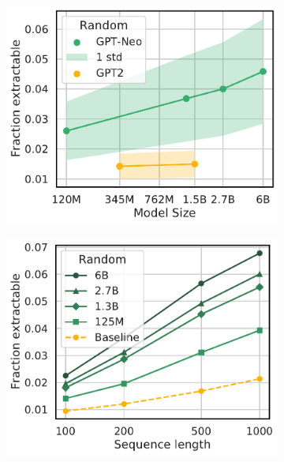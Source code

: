 \begin{figure}
    \centering
    \begin{subfigure}[a]{0.34\textwidth}
        \includegraphics[width=\textwidth]{figures/random-exactly_mem-vs-model_size-prompt-all-gen-50-xlabel-ylabel} %
        \caption{}
        \label{fig:other_approaches_randomsize}
    \end{subfigure}
    \hfill
    \begin{subfigure}[a]{0.34\textwidth}
        \includegraphics[width=\textwidth]{figures/random_exactly_mem-vs-prompt_len-seq-varyseqlen-gen-50-xlabel-ylabel-markers} %

\end{subfigure}
\end{figure}
